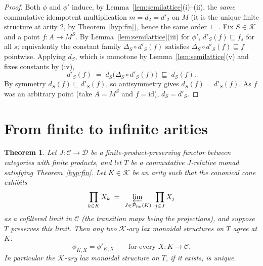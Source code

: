 \documentclass{article}
\newtheorem{theorem}{Theorem}
\newcommand{\C}{\mathcal{C}}
\newcommand{\D}{\mathcal{D}}
\newcommand{\K}{\mathcal{K}}
\newcommand{\id}{\mathrm{id}}
\begin{document}
\begin{proof}
Both $\phi$ and $\phi'$ induce, by Lemma~\ref{lem:semilattice}(i)--(ii), the
\emph{same} commutative idempotent multiplication $m=d_2=d'_2$ on $M$ (it is the
unique finite structure at arity $2$, by Theorem~\ref{hyp:fin}), hence the same
order $\sqsubseteq$. Fix $S\in\K$ and a point $f\colon A\to M^{S}$. By
Lemma~\ref{lem:semilattice}(iii) for $\phi'$, $d'_S(f)\sqsubseteq f_s$ for all
$s$; equivalently the constant family $\Delta_S\circ d'_S(f)$ satisfies
$\Delta_S\circ d'_S(f)\sqsubseteq f$ pointwise. Applying $d_S$, which is monotone
by Lemma~\ref{lem:semilattice}(v) and fixes constants by (iv),
\[
  d'_S(f)\;=\;d_S\bigl(\Delta_S\circ d'_S(f)\bigr)\;\sqsubseteq\; d_S(f).
\]
By symmetry $d_S(f)\sqsubseteq d'_S(f)$, so antisymmetry gives $d_S(f)=d'_S(f)$.
As $f$ was an arbitrary point (take $A=M^{S}$ and $f=\id$), $d_S=d'_S$.
\end{proof}

\section{From finite to infinite arities}

\begin{theorem}\label{thm:main}
Let $J\colon\C\to\D$ be a finite-product-preserving functor between categories
with finite products, and let $T$ be a commutative $J$-relative monad satisfying
Theorem~\ref{hyp:fin}. Let $K\in\K$ be an arity such that the canonical cone
exhibits
\[
  \prod_{k\in K}X_k \;=\; \varprojlim_{\,J\in\mathcal P_{\mathrm{fin}}(K)}\ \prod_{j\in J}X_j
\]
as a cofiltered limit in $\C$ \emph{(}the transition maps being the
projections\emph{)}, and suppose $T$ preserves this limit. Then any two $\K$-ary
lax monoidal structures on $T$ agree at $K$:
\[
  \phi_{K,X}=\phi'_{K,X}\qquad\text{for every }X\colon K\to\C .
\]
In particular the $\K$-ary lax monoidal structure on $T$, if it exists, is
unique.
\end{theorem}
\end{document}
